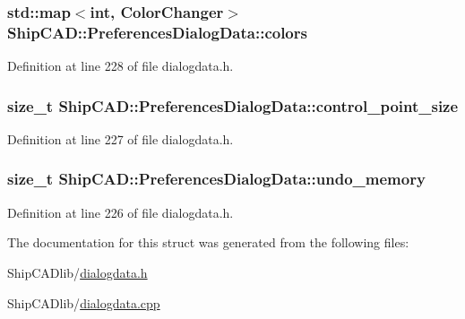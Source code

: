 \subsubsection[{\texorpdfstring{colors}{colors}}]{\setlength{\rightskip}{0pt plus 5cm}std\+::map$<$int, {\bf Color\+Changer}$>$ Ship\+C\+A\+D\+::\+Preferences\+Dialog\+Data\+::colors}\hypertarget{structShipCAD_1_1PreferencesDialogData_aefc358c8c80389053e1a3b2f333d6da9}{}\label{structShipCAD_1_1PreferencesDialogData_aefc358c8c80389053e1a3b2f333d6da9}


Definition at line 228 of file dialogdata.\+h.

\subsubsection[{\texorpdfstring{control\+\_\+point\+\_\+size}{control_point_size}}]{\setlength{\rightskip}{0pt plus 5cm}size\+\_\+t Ship\+C\+A\+D\+::\+Preferences\+Dialog\+Data\+::control\+\_\+point\+\_\+size}\hypertarget{structShipCAD_1_1PreferencesDialogData_a53ba0a8f8b1cf70ea78d1162703abc6c}{}\label{structShipCAD_1_1PreferencesDialogData_a53ba0a8f8b1cf70ea78d1162703abc6c}


Definition at line 227 of file dialogdata.\+h.

\subsubsection[{\texorpdfstring{undo\+\_\+memory}{undo_memory}}]{\setlength{\rightskip}{0pt plus 5cm}size\+\_\+t Ship\+C\+A\+D\+::\+Preferences\+Dialog\+Data\+::undo\+\_\+memory}\hypertarget{structShipCAD_1_1PreferencesDialogData_a221dfa5e704ab65d7ea8552736738da2}{}\label{structShipCAD_1_1PreferencesDialogData_a221dfa5e704ab65d7ea8552736738da2}


Definition at line 226 of file dialogdata.\+h.



The documentation for this struct was generated from the following files\+:\begin{DoxyCompactItemize}
\item 
Ship\+C\+A\+Dlib/\hyperlink{dialogdata_8h}{dialogdata.\+h}\item 
Ship\+C\+A\+Dlib/\hyperlink{dialogdata_8cpp}{dialogdata.\+cpp}\end{DoxyCompactItemize}
